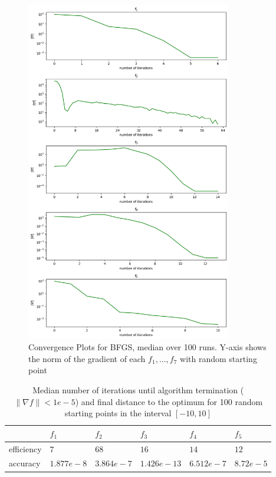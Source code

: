 \documentclass[a4paper]{article}
\begin{document}
\begin{figure}[]
  \centering
  \includegraphics[width=0.8\textwidth]{plt_grad_norms.png}
  \caption{Convergence Plots for BFGS, median over 100 runs. Y-axis shows the
    norm of the gradient of each $f_1,...,f_7$ with random starting point}
  \label{plt2}
\end{figure}

\begin{table}[]
\centering
\begin{tabular}{|l|l|l|l|l|l|}
\hline
                 & $f_1$ & $f_2$   & $f_3$  & $f_4$  & $f_5$ \\ \hline
efficiency & $7$ & $68$ & $16$ & $14$ & $12$ \\ \hline
accuracy & $1.877e-8$  & $3.864e-7$ & $1.426e-13$  & $6.512e-7$  & $8.72e-5$ \\ \hline
\end{tabular}
\caption{Median number of iterations until algorithm termination ( $\| \nabla f \| < 1e-5$) and final distance to the optimum for 100 random starting points in the interval $[-10,10]$}
\label{table}
\end{table}
\end{document}

